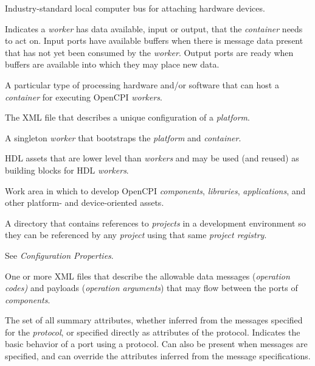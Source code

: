 \begin{description}[style=nextline]
\item[PCI (Peripheral Component Interconnect)]
Industry-standard local computer bus for attaching hardware devices.

\item[Port Readiness]
Indicates a \textit{worker} has data available, input or output, that the \textit{container} needs to act on. Input ports have available buffers when there is message data present that has not yet been consumed by the \textit{worker}. Output ports are ready when buffers are available into which they may place new data.

\item[Platform]
A particular type of processing hardware and/or software that can host a \textit{container} for executing OpenCPI \textit{workers}.

\item[Platform Configuration]
The XML file that describes a unique configuration of a \textit{platform}.

\item[Platform Worker]
A singleton \textit{worker} that bootstraps the \textit{platform} and \textit{container}.

\item[Primitive]
HDL assets that are lower level than \textit{workers} and may be used (and reused) as building blocks for HDL \textit{workers}.

\item[Project]
Work area in which to develop OpenCPI \textit{components}, \textit{libraries}, \textit{applications}, and other platform- and device-oriented assets.

\item[Project Registry]
A directory that contains references to \textit{projects} in a development environment so they can be referenced by any \textit{project} using that same \textit{project registry}.

\item[Property]
See \textit{Configuration Properties}.

\item[Protocol Specification (OPS)]
One or more XML files that describe the allowable data messages (\textit{operation codes)} and payloads (\textit{operation arguments}) that may flow between the ports of \textit{components}.

\item[Protocol Summary]
The set of all summary attributes, whether inferred from the messages specified for the \textit{protocol}, or specified directly as attributes of the protocol. Indicates the basic behavior of a port using a protocol.  Can also be present when messages are specified, and can override the attributes inferred from the message specifications.


\end{description}
